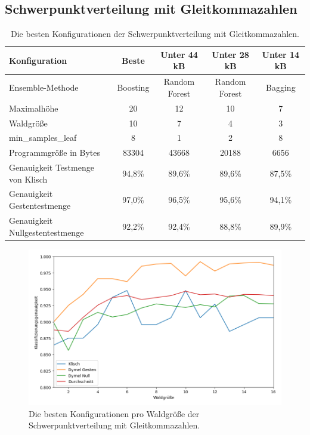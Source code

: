 \subsection{Schwerpunktverteilung mit Gleitkommazahlen}
\begin{table}[h!]
    \hspace{-0.75cm}
    \begin{tabular}{ | l | c | c | c | c |}
        \hline
        Konfiguration & Beste & Unter 44 kB & Unter 28 kB & Unter 14 kB \\\hline
        Ensemble-Methode & Boosting & Random Forest & Random Forest & Bagging  \\\hline
        Maximalhöhe & 20 & 12 & 10 & 7 \\\hline
        Waldgröße & 10 & 7 & 4 & 3 \\\hline
        min\_samples\_leaf & 8 & 1 & 2 & 8 \\\hline
        Programmgröße in Bytes & 83304 & 43668 & 20188 & 6656 \\\hline
        Genauigkeit Testmenge von Klisch & 94,8\% & 89,6\% & 89,6\% & 87,5\% \\\hline
        Genauigkeit Gestentestmenge & 97,0\% & 96,5\% & 95,6\% & 94,1\% \\\hline
        Genauigkeit Nullgestentestmenge & 92,2\% & 92,4\% & 88,8\% & 89,9\% \\\hline
    \end{tabular}
    \caption{Die besten Konfigurationen der Schwerpunktverteilung mit Gleitkommazahlen.}
    \label{tab:schwerpunktverteilung_float}
\end{table}
\begin{figure}[h!]
    \centering
    \includegraphics[width=\linewidth]{images/cocd_float_acc_per_size.png}
    \caption{Die besten Konfigurationen pro Waldgröße der Schwerpunktverteilung mit Gleitkommazahlen.}
    \label{fig:cocd_float_per_forest_size}
\end{figure}
